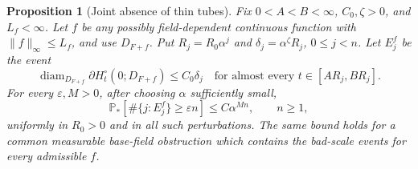 \documentclass[11pt,reqno]{amsart}
\theoremstyle{plain}
\newtheorem{proposition}[theorem]{Proposition}
\theoremstyle{definition}
\theoremstyle{remark}
\newcommand{\Pp}{\mathbb P}
\newcommand{\diam}{\operatorname{diam}}
\newcommand{\1}{\mathbf{1}}
\begin{document}
\begin{proposition}[Joint absence of thin tubes]\label{prop:notube}
Fix $0<A<B<\infty$, $C_0,\zeta>0$, and $L_f<\infty$. Let $f$ be any possibly field-dependent continuous function with $\|f\|_\infty\le L_f$, and use $D_{F+f}$. Put $R_j=R_0\alpha^j$ and $\delta_j=\alpha^\zeta R_j$, $0\le j<n$. Let $E_j^f$ be the event
\begin{equation}\label{eq:thin-event}
\diam_{D_{F+f}}\partial H_t^\circ(0;D_{F+f})\le C_0\delta_j
\quad\text{for almost every }t\in[AR_j,BR_j].
\end{equation}
For every $\varepsilon,M>0$, after choosing $\alpha$ sufficiently small,
\begin{equation}\label{eq:notube}
\Pp_*[\#\{j:E_j^f\}\ge\varepsilon n]\le C\alpha^{Mn},\qquad n\ge1,
\end{equation}
uniformly in $R_0>0$ and in all such perturbations. The same bound holds for a common measurable base-field obstruction which contains the bad-scale events for every admissible $f$.
\end{proposition}
\end{document}
